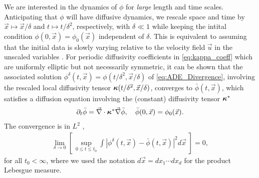 \documentclass[11pt]{amsart}
\newcommand\bkappa{\mbox{\boldmath${\kappa}$}}
\begin{document}
We are interested in the dynamics of $\phi$ for \emph{large} length and
time scales. Anticipating that $\phi$ will have diffusive dynamics, we
rescale space and time by $\vec{x}\mapsto\vec{x}/\delta$ and $t\mapsto t/\delta^2$,
respectively, with $\delta\ll1$ while keeping the intital condition
$\phi(0,\vec{x})=\phi_0(\vec{x})$ independent 
of $\delta$. This is equivalent to assuming that the initial data is slowly
varying relative to the velocity field $\vec{u}$ in the unscaled
variables
\cite{McLaughlin:SIAM_JAM:780,Fannjiang:SIAM_JAM:333,Fannjiang:1997:1033}. 
For periodic diffusivity coefficients in \eqref{eq:kappa_coeff} which
are uniformly elliptic but not necessarily symmetric, it can be shown 
\cite{Fannjiang:SIAM_JAM:333} that the associated solution
$\phi^\delta(t,\vec{x})=\phi(t/\delta^2,\vec{x}/\delta)$  of \eqref{eq:ADE_Divergence},
involving the rescaled local diffusivity tensor
$\bkappa(t/\delta^2,\vec{x}/\delta)$, converges to $\bar{\phi}(t,\vec{x})$, which
satisfies a diffusion equation involving the (constant)
diffusivity tensor $\bkappa^*$
%
\begin{align}
  \partial_t\bar{\phi}=\vec{\nabla}\cdot\bkappa^*\vec{\nabla}\bar{\phi}, \quad
  \bar{\phi}(0,\vec{x})=\phi_0(\vec{x}).
\end{align}
%
The convergence is in $L^2$ \cite{Fannjiang:SIAM_JAM:333},
%
\begin{align}
  \lim_{\delta\to0}\left[\,\sup_{0\leq t\leq t_0}
    \int\left|\phi^\delta(t,\vec{x})-\bar{\phi}(t,\vec{x})\right|^2d\vec{x}
    \;\right]=0,
\end{align}
%
for all $t_0<\infty$, where we used the notation $d\vec{x}=dx_1\cdots dx_d$ for
the product Lebesgue measure.
\end{document}
